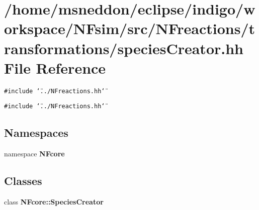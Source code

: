 \section{/home/msneddon/eclipse/indigo/workspace/NFsim/src/NFreactions/transformations/speciesCreator.hh File Reference}
\label{speciesCreator_8hh}


{\tt \#include \char`\"{}../NFreactions.hh\char`\"{}}\par
{\tt \#include \char`\"{}../NFreactions.hh\char`\"{}}\par
\subsection*{Namespaces}
\begin{CompactItemize}
\item 
namespace {\bf NFcore}
\end{CompactItemize}
\subsection*{Classes}
\begin{CompactItemize}
\item 
class {\bf NFcore::SpeciesCreator}
\end{CompactItemize}
